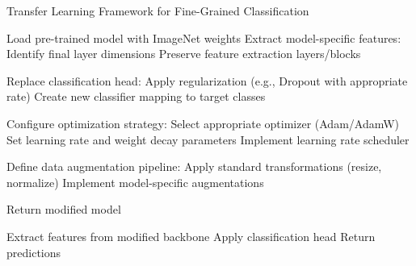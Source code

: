 \documentclass[a4paper,12pt]{article}
\begin{document}
                            \begin{algorithm}
                                \caption{Transfer Learning Framework for Fine-Grained Classification}
                                \begin{algorithmic}[1]
                                    \State Load pre-trained model with ImageNet weights
                                    \State Extract model-specific features:
                                    \Indent
                                        \State Identify final layer dimensions
                                        \State Preserve feature extraction layers/blocks
                                    \EndIndent
                                    
                                    \State Replace classification head:
                                    \Indent
                                        \State Apply regularization (e.g., Dropout with appropriate rate)
                                        \State Create new classifier mapping to target classes
                                    \EndIndent
                                    
                                    \State Configure optimization strategy:
                                    \Indent
                                        \State Select appropriate optimizer (Adam/AdamW)
                                        \State Set learning rate and weight decay parameters
                                        \State Implement learning rate scheduler
                                    \EndIndent
                                    
                                    \State Define data augmentation pipeline:
                                    \Indent
                                        \State Apply standard transformations (resize, normalize)
                                        \State Implement model-specific augmentations
                                    \EndIndent
                                    
                                    \State Return modified model
                                \EndFunction
                                
                                    \State Extract features from modified backbone
                                    \State Apply classification head
                                    \State Return predictions
                                \EndFunction
                                

\end{algorithmic}
\end{algorithm}
\end{document}
